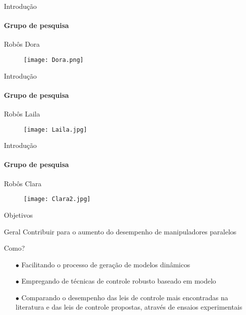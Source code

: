 \documentclass[25pt,landscape]{beamer}
\begin{document}
\begin{frame}{Introdução}
	\framesubtitle{Grupo de pesquisa}
	\begin{block}{Rob\^os}
		Dora
    \end{block}
    \begin{figure}[!h]
        \centering
        \texttt{[image: Dora.png]}
    \end{figure}
\end{frame}

\begin{frame}{Introdução}
	\framesubtitle{Grupo de pesquisa}
	\begin{block}{Rob\^os}
		Laila
    \end{block}
    \begin{figure}[!h]
        \centering
        \texttt{[image: Laila.jpg]}
    \end{figure}
\end{frame}

\begin{frame}{Introdução}
	\framesubtitle{Grupo de pesquisa}
	\begin{block}{Rob\^os}
		Clara
    \end{block}
    \begin{figure}[!h]
        \centering
        \texttt{[image: Clara2.jpg]}
    \end{figure}
\end{frame}

\begin{frame}{Objetivos}
	\begin{block}{Geral}
		Contribuir para o aumento do desempenho de manipuladores paralelos
	\end{block}
	\begin{exampleblock}{Como?}
		\begin{itemize}
			\item[$\bullet$] Facilitando o processo de geração de modelos dinâmicos \\[8pt]
			\item[$\bullet$] Empregando de técnicas de controle robusto baseado em modelo \\[8pt]
			\item[$\bullet$] Comparando o desempenho das leis de controle mais encontradas na literatura e das leis de controle propostas, atrav\'es de ensaios experimentais \\[8pt]
		\end{itemize}
	\end{exampleblock}
\end{frame}
\end{document}

